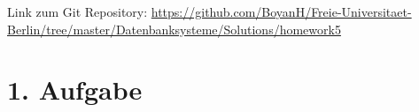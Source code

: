 \usepackage{graphicx}
\usepackage{fancyvrb}

\newcommand{\dozent}{Prof. Dr. Agn`es Voisard, Nicolas Lehmann}					%
\newcommand{\tutor}{Nicolas Lehmann}						%
\newcommand{\tutoriumNo}{10}				%
\newcommand{\projectNo}{5}									%
\newcommand{\veranstaltung}{Datenbanksysteme}	%
\newcommand{\semester}{SoSe 2017}						%
\newcommand{\studenten}{Boyan Hristov, Julian Habib}			%





Link zum Git Repository: \url{https://github.com/BoyanH/Freie-Universitaet-Berlin/tree/master/Datenbanksysteme/Solutions/homework5}

\section*{1. Aufgabe}

